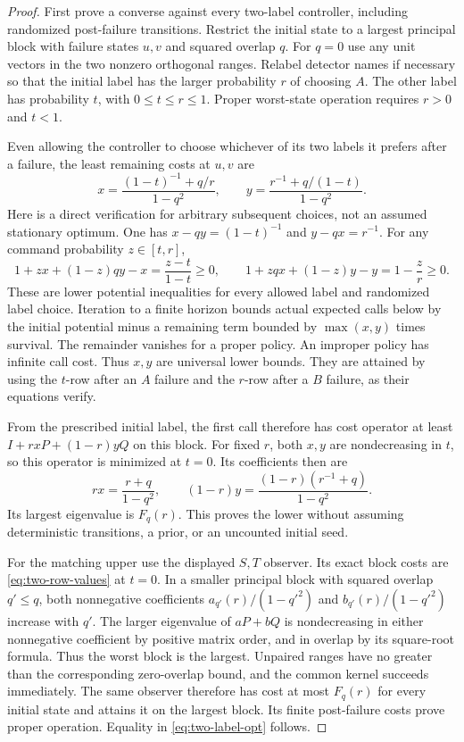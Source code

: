\begin{proof}
First prove a converse against every two-label controller, including randomized post-failure transitions. Restrict the initial state to a largest principal block with failure states $u,v$ and squared overlap $q$. For $q=0$ use any unit vectors in the two nonzero orthogonal ranges. Relabel detector names if necessary so that the initial label has the larger probability $r$ of choosing $A$. The other label has probability $t$, with $0\le t\le r\le1$. Proper worst-state operation requires $r>0$ and $t<1$.

Even allowing the controller to choose whichever of its two labels it prefers after a failure, the least remaining costs at $u,v$ are
\begin{equation}\label{eq:two-row-values}
 x=\frac{(1-t)^{-1}+q/r}{1-q^2},\qquad
 y=\frac{r^{-1}+q/(1-t)}{1-q^2}.
\end{equation}
Here is a direct verification for arbitrary subsequent choices, not an assumed stationary optimum. One has $x-qy=(1-t)^{-1}$ and $y-qx=r^{-1}$. For any command probability $z\in[t,r]$,
\[
 1+zx+(1-z)qy-x=\frac{z-t}{1-t}\ge0,
 \qquad
 1+zqx+(1-z)y-y=1-\frac zr\ge0.
\]
These are lower potential inequalities for every allowed label and randomized label choice. Iteration to a finite horizon bounds actual expected calls below by the initial potential minus a remaining term bounded by $\max(x,y)$ times survival. The remainder vanishes for a proper policy. An improper policy has infinite call cost. Thus $x,y$ are universal lower bounds. They are attained by using the $t$-row after an $A$ failure and the $r$-row after a $B$ failure, as their equations verify.

From the prescribed initial label, the first call therefore has cost operator at least $I+rxP+(1-r)yQ$ on this block. For fixed $r$, both $x,y$ are nondecreasing in $t$, so this operator is minimized at $t=0$. Its coefficients then are
\[
 rx=\frac{r+q}{1-q^2},\qquad
 (1-r)y=\frac{(1-r)(r^{-1}+q)}{1-q^2}.
\]
Its largest eigenvalue is $F_q(r)$. This proves the lower without assuming deterministic transitions, a prior, or an uncounted initial seed.

For the matching upper use the displayed $S,T$ observer. Its exact block costs are \eqref{eq:two-row-values} at $t=0$. In a smaller principal block with squared overlap $q'\le q$, both nonnegative coefficients $a_{q'}(r)/(1-q'^2)$ and $b_{q'}(r)/(1-q'^2)$ increase with $q'$. The larger eigenvalue of $aP+bQ$ is nondecreasing in either nonnegative coefficient by positive matrix order, and in overlap by its square-root formula. Thus the worst block is the largest. Unpaired ranges have no greater than the corresponding zero-overlap bound, and the common kernel succeeds immediately. The same observer therefore has cost at most $F_q(r)$ for every initial state and attains it on the largest block. Its finite post-failure costs prove proper operation. Equality in \eqref{eq:two-label-opt} follows.


\end{proof}

